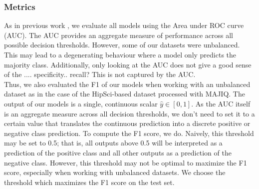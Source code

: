 \subsubsection{Metrics} \label{subsubsec:metrics}
As in previous work \cite{dsc}, we evaluate all models using the Area under ROC curve (AUC). The AUC provides an aggregate measure of performance across all possible decision thresholds.
However, some of our datasets were unbalanced. This may lead to a degenerating behaviour where a model only predicts the majority class. Additionally, only looking at the AUC does not give a good sense of the .... specificity.. recall?
This is not captured by the AUC. \\
Thus, we also evaluated the F1 of our models when working with an unbalanced dataset as in the case of the HipSci-based dataset processed with MAJIQ.
The output of our models is a single, continuous scalar $\hat{y} \in [0, 1]$. As the AUC itself is an aggregate measure across all decision thresholds, we don't need to set it to a certain value that translates the continuous prediction into a discrete positive or negative class prediction. To compute the F1 score, we do. Naively, this threshold may be set to 0.5; that is, all outputs above 0.5 will be interpreted as a prediction of the positive class and all other outputs as a prediction of the negative class. However, this threshold may not be optimal to maximize the F1 score, especially when working with unbalanced datasets. We choose the threshold which maximizes the F1 score on the test set.



